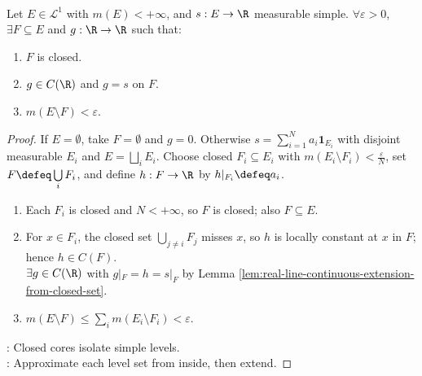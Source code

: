 \begin{proposition} \label{prop:simple-functions-continuous-on-large-closed-set} \\
Let $E\in\mathcal{L}^1$ with $m(E)<+\infty$, and $s:E\to\R$ measurable simple. $\forall \varepsilon>0$, $\exists F\subseteq E$ and $g:\R\to\R$ such that:
\begin{enumerate}[label=(\roman*)]
\setlength{\itemsep}{0pt}
\item $F$ is closed.
\item $g\in C(\R)$ and $g=s$ on $F$.
\item $m(E\setminus F)<\varepsilon$.
\end{enumerate}
\begin{proof} If $E=\emptyset$, take $F=\emptyset$ and $g=0$. Otherwise $s=\sum\limits_{i=1}^{N}a_i\mathbf{1}_{E_i}$ with disjoint measurable $E_i$ and $E=\bigsqcup\limits_iE_i$. Choose closed $F_i\subseteq E_i$ with $m(E_i\setminus F_i)<\frac{\varepsilon}{N}$, set $F\defeq\bigcup\limits_iF_i$, and define $h:F\to\R$ by $h|_{F_i}\defeq a_i$.
\begin{enumerate}[label=(\roman*)]
\setlength{\itemsep}{0pt}
\item Each $F_i$ is closed and $N<+\infty$, so $F$ is closed; also $F\subseteq E$.
\item For $x\in F_i$, the closed set $\bigcup\limits_{j\neq i}F_j$ misses $x$, so $h$ is locally constant at $x$ in $F$; hence $h\in C(F)$.\\
$\exists g\in C(\R)$ with $g|_F=h=s|_F$ by Lemma \ref{lem:real-line-continuous-extension-from-closed-set}.
\item $m(E\setminus F)\leq\sum\limits_i m(E_i\setminus F_i)<\varepsilon$.
\end{enumerate}
: Closed cores isolate simple levels.\\
: Approximate each level set from inside, then extend.
\end{proof}
\end{proposition}

